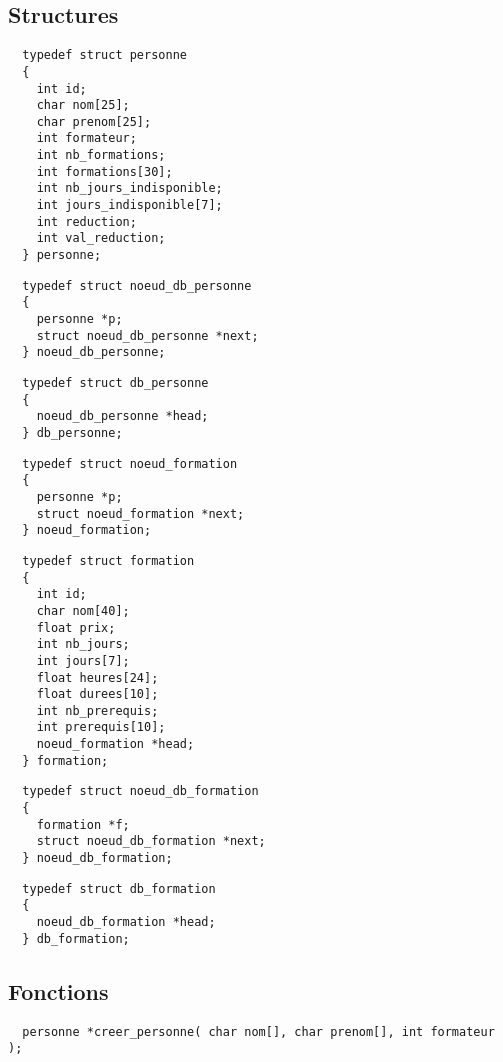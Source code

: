\documentclass[11pt]{article}
\begin{document}
\subsection{Structures}

\begin{lstlisting}
  typedef struct personne
  {
    int id;
    char nom[25];
    char prenom[25];
    int formateur;
    int nb_formations;
    int formations[30];
    int nb_jours_indisponible;
    int jours_indisponible[7];
    int reduction;
    int val_reduction;
  } personne;
\end{lstlisting}

\begin{lstlisting}
  typedef struct noeud_db_personne
  {
    personne *p;
    struct noeud_db_personne *next;
  } noeud_db_personne;
\end{lstlisting}

\begin{lstlisting}
  typedef struct db_personne
  {
    noeud_db_personne *head;
  } db_personne;
\end{lstlisting}

\begin{lstlisting}
  typedef struct noeud_formation
  {
    personne *p;
    struct noeud_formation *next;
  } noeud_formation;
\end{lstlisting}

\begin{lstlisting}
  typedef struct formation
  {
    int id;
    char nom[40];
    float prix;
    int nb_jours;
    int jours[7];
    float heures[24];
    float durees[10];
    int nb_prerequis;
    int prerequis[10];
    noeud_formation *head;
  } formation;
\end{lstlisting}

\begin{lstlisting}
  typedef struct noeud_db_formation
  {
    formation *f;
    struct noeud_db_formation *next;
  } noeud_db_formation;
\end{lstlisting}

\begin{lstlisting}
  typedef struct db_formation
  {
    noeud_db_formation *head;
  } db_formation;
\end{lstlisting}

\newpage
\subsection{Fonctions}

\begin{lstlisting}
  personne *creer_personne( char nom[], char prenom[], int formateur );
\end{lstlisting}
\end{document}

